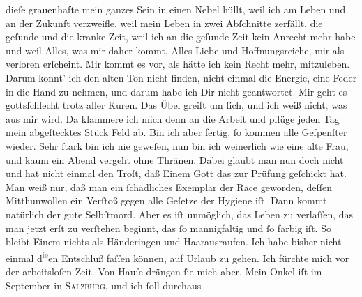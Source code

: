 \begin{ledgroupsized}[t]{13cm}
                  dieſe grauenhafte \label{K_L02711-1v}\label{K_L02711-1h} mein ganzes Sein in einen Nebel hüllt, weil ich am Leben und an der Zukunft
               verzweifle, weil mein Leben {\pb}in zwei Abſchnitte
               zerfällt, die geſunde und die kranke Zeit, weil ich an die geſunde Zeit kein Anrecht
               mehr habe und weil Alles, was mir daher kommt, Alles Liebe und Hoffnungsreiche, mir
               als verloren erſcheint. Mir kommt es vor, als hätte ich kein Recht mehr, mitzuleben.
               Darum konnt’ ich den alten Ton nicht finden, nicht einmal die Energie, eine Feder in
               die Hand zu nehmen, und darum habe ich Dir nicht geantwortet\textcolor{gray}{.} Mir
               geht es gottsſchlecht trotz aller Kuren. Das Übel greift um ſich, und ich weiß
                  nicht\textcolor{gray}{,} was aus mir wird. Da klammere ich mich denn an die
               Arbeit und pflüge jeden Tag mein abgeſtecktes Stück Feld ab. Bin ich aber fertig, ſo
               kommen alle Geſpenſter {\pb}wieder. Sehr ſtark bin ich
               nie geweſen, nun bin ich weinerlich wie eine alte Frau, und kaum ein Abend vergeht
               ohne Thränen. Dabei glaubt man nun doch nicht und hat nicht einmal den Troſt, daß
               Einem Gott das zur Prüfung geſchickt hat. Man weiß nur, daß man ein ſchädliches
               Exemplar der Race geworden, deſſen Mitthunwollen ein Verſtoß gegen alle Geſetze der
               Hygiene iſt. Dann kommt natürlich der gute Selbſtmord. Aber es iſt unmöglich, das
               Leben zu verlaſſen, das man jetzt erſt zu verſtehen beginnt, das ſo mannigfaltig und
               ſo farbig iſt. So bleibt Einem nichts als Händeringen und Haarausraufen.\pend
           \pstart
           Ich habe bisher nicht einmal d\substVorne{}\textsuperscript{\textcolor{gray}{ie}}\substDazwischen{}en\substHinten{} Entschluß faſſen können, auf Urlaub zu gehen. {\pb}Ich fürchte mich vor der arbeitsloſen Zeit. Von
               Hauſe drängen ſie mich aber. Mein Onkel iſt im September in \textsc{Salzburg}, und ich ſoll durchaus \label{K_L02711-2v}
\end{ledgroupsized}
